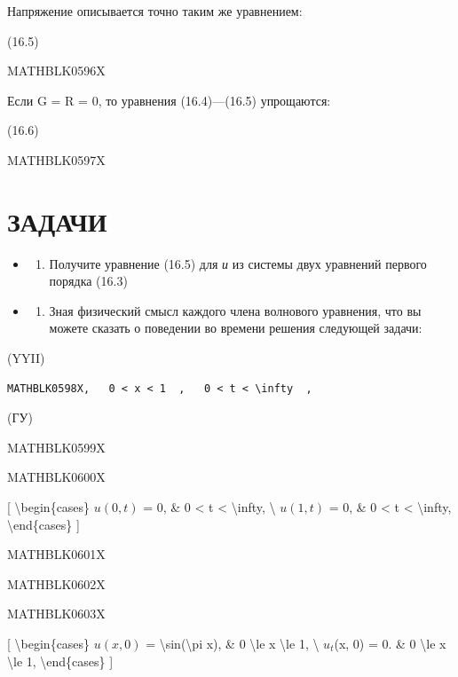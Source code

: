 \documentclass[
]{article}
\providecommand{\tightlist}{%
  \setlength{\itemsep}{0pt}\setlength{\parskip}{0pt}}
\begin{document}
{{Напряжение описывается точно таким же уравнением:

(16.5)

MATHBLK0596X

Если G = R = 0, то уравнения (16.4)---(16.5) упрощаются:

(16.6)

MATHBLK0597X

\section{ЗАДАЧИ}\label{ux437ux430ux434ux430ux447ux438-2}

\begin{itemize}
\tightlist
\item
  \begin{enumerate}
  \def\labelenumi{\arabic{enumi}.}
  \tightlist
  \item
    Получите уравнение (16.5) для \emph{и} из системы двух уравнений
    первого порядка (16.3)
  \end{enumerate}
\item
  \begin{enumerate}
  \def\labelenumi{\arabic{enumi}.}
  \setcounter{enumi}{1}
  \tightlist
  \item
    Зная физический смысл каждого члена волнового уравнения, что вы
    можете сказать о поведении во времени решения следующей задачи:
  \end{enumerate}
\end{itemize}

(YYII)

\begin{verbatim}
MATHBLK0598X,   0 < x < 1  ,   0 < t < \infty  ,
\end{verbatim}

(ГУ)

MATHBLK0599X

MATHBLK0600X

{[} \textbackslash begin\{cases\} \(u(0, t)\) = 0, \& 0 \textless{} t
\textless{} \textbackslash infty, \textbackslash{} \(u(1, t)\) = 0, \& 0
\textless{} t \textless{} \textbackslash infty,
\textbackslash end\{cases\} {]}

MATHBLK0601X

MATHBLK0602X

MATHBLK0603X

{[} \textbackslash begin\{cases\} \(u(x, 0)\) =
\textbackslash sin(\textbackslash pi x), \& 0 \textbackslash le x
\textbackslash le 1, \textbackslash{} \(u_t\)(x, 0) = 0. \& 0
\textbackslash le x \textbackslash le 1, \textbackslash end\{cases\} {]}

}}
\end{document}
